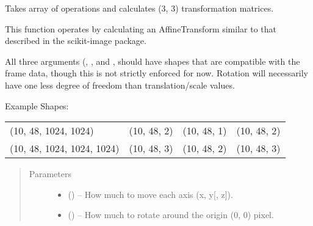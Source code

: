 \documentclass[letterpaper,10pt,english]{sphinxmanual}
\begin{document}

\begin{fulllineitems}
\label{\detokenize{xanespy:xanespy.xanes_math.transformation_matrices}}
Takes array of operations and calculates (3, 3) transformation
matrices.

This function operates by calculating an AffineTransform similar
to that described in the scikit-image package.

All three arguments (, , and ,
should have shapes that are compatible with the frame data, though
this is not strictly enforced for now. Rotation will necessarily
have one less degree of freedom than translation/scale values.

Example Shapes:

\noindent\begin{tabulary}{\linewidth}{|L|L|L|L|}
\hline
{}\relax &\relax &\relax &\relax \\
\hline
(10, 48, 1024, 1024)
&
(10, 48, 2)
&
(10, 48, 1)
&
(10, 48, 2)
\\
\hline
(10, 48, 1024, 1024, 1024)
&
(10, 48, 3)
&
(10, 48, 2)
&
(10, 48, 3)
\\
\hline\end{tabulary}

\begin{quote}\begin{description}
\item[{Parameters}] \leavevmode\begin{itemize}
\item {} 
 (\sphinxstyleliteralemphasis{, }) -- How much to move each axis (x, y{[}, z{]}).

\item {} 
 (\sphinxstyleliteralemphasis{, }) -- How much to rotate around the origin (0, 0) pixel.


\end{itemize}
\end{description}
\end{quote}
\end{fulllineitems}
\end{document}
